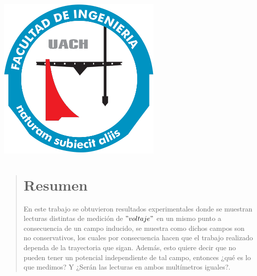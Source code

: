 \documentclass[a0,portrait]{a0poster}
\begin{document}
\begin{minipage}[ht]{0.15\linewidth}
    \includegraphics[width=8cm]{figures/logo ingenieria.png}\\
\end{minipage}





\begin{center}
    \begin{minipage}{0.7\textwidth}
        \begin{abstract}
       \centering \section*{Resumen}
       \large
            En este trabajo se obtuvieron resultados experimentales donde se muestran lecturas distintas de medición de $"voltaje"$ en un mismo punto a consecuencia de un campo inducido, se muestra como dichos campos son no conservativos, los cuales por consecuencia hacen que el trabajo realizado dependa de la trayectoria que sigan. Además, esto quiere decir que no pueden tener un potencial independiente de tal campo, entonces ¿qué es lo que medimos? Y ¿Serán las lecturas en ambos multímetros iguales?.
        \end{abstract}
    \end{minipage}
\end{center}
\end{document}
